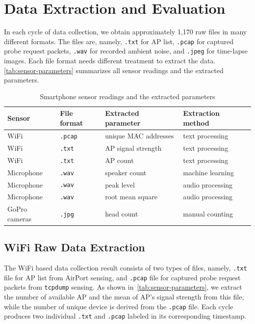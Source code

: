 \section{Data Extraction and Evaluation} %
\label{sec:data_extraction_and_evaluation}
In each cycle of data collection, we obtain approximately 1,170 raw files in many different formats. The files are, namely, \verb|.txt| for \ac{AP} list, \verb|.pcap| for captured probe request packets, \verb|.wav| for recorded ambient noise, and \verb|.jpeg| for time-lapse images. Each file format needs different treatment to extract the data. \autoref{tab:sensor-parameters} summarizes all sensor readings and the extracted parameters.

\begin{table}[]
\centering
\caption{Smartphone sensor readings and the extracted parameters}
\label{tab:sensor-parameters}
\begin{tabular}{llll}\toprule
Sensor     & File format & Extracted parameter & Extraction method\\ \midrule
WiFi       & \verb|.pcap| & unique \ac{MAC} addresses     & text processing \\
WiFi       & \verb|.txt| & \ac{AP} signal strength     & text processing \\
WiFi       & \verb|.txt| & \ac{AP} count            & text processing \\
Microphone & \verb|.wav| & speaker count       & machine learning \\
Microphone & \verb|.wav| & peak level          & audio processing \\
Microphone & \verb|.wav| & root mean square    & audio processing \\
GoPro cameras & \verb|.jpg| & head count       & manual counting\\
\bottomrule
\end{tabular}
\end{table}

\subsection{WiFi Raw Data Extraction} %
\label{sub:wifi_raw_data_extraction}
The WiFi based data collection result consists of two types of files, namely, \verb|.txt| file for \ac{AP} list from AirPort sensing, and \verb|.pcap| file for captured probe request packets from \verb|tcpdump| sensing. As shown in~\autoref{tab:sensor-parameters}, we extract the number of available \ac{AP} and the mean of \ac{AP}'s signal strength from this file, while the number of unique device is derived from the \verb|.pcap| file. Each cycle produces two individual \verb|.txt| and \verb|.pcap| labeled in its corresponding timestamp.

